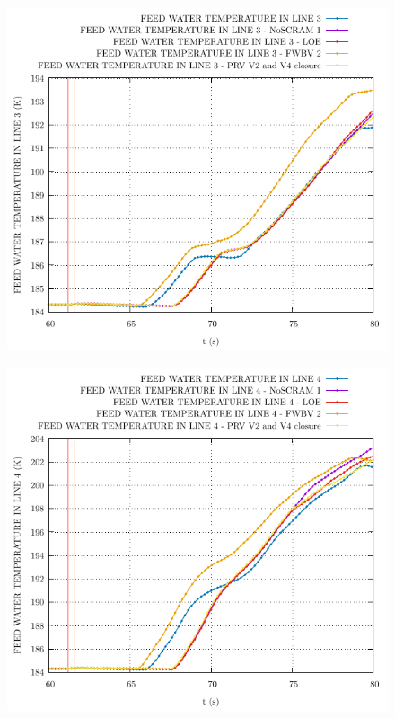 \documentclass{article}
\begin{document}
\begin{multicols}{2}
\begin{figure}[H]
\centering
\includegraphics[width=\linewidth]{./graphs/FEED WATER TEMPERATURE IN LINE 3.pdf}
\end{figure}
\begin{figure}[H]
\centering
\includegraphics[width=\linewidth]{./graphs/FEED WATER TEMPERATURE IN LINE 4.pdf}
\end{figure}

\end{multicols}
\end{document}
